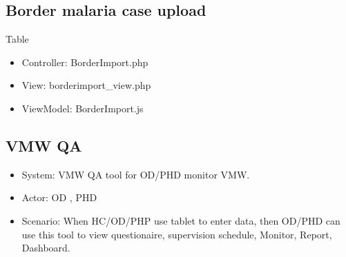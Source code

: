 \documentclass[letterpaper,10pt,english,openany,oneside]{sphinxmanual}
\begin{document}
\subsection{Border malaria case upload}
\label{\detokenize{module/module:border-malaria-case-upload}}
\sphinxAtStartPar
Table

\begin{sphinxVerbatim}[commandchars=\\\{\}]
                
  
                
\end{sphinxVerbatim}
\begin{itemize}
\item {} 
\sphinxAtStartPar
Controller: BorderImport.php

\item {} 
\sphinxAtStartPar
View: borderimport\_view.php

\item {} 
\sphinxAtStartPar
ViewModel: BorderImport.js

\end{itemize}


\subsection{VMW QA}
\label{\detokenize{module/module:vmw-qa}}\begin{itemize}
\item {} 
\sphinxAtStartPar
System: VMW QA tool for OD/PHD monitor VMW.

\item {} 
\sphinxAtStartPar
Actor: OD , PHD

\item {} 
\sphinxAtStartPar
Scenario: When HC/OD/PHP use tablet to enter data, then OD/PHD can use this tool to view questionaire, supervision schedule, Monitor, Report, Dashboard.

\end{itemize}
\end{document}

